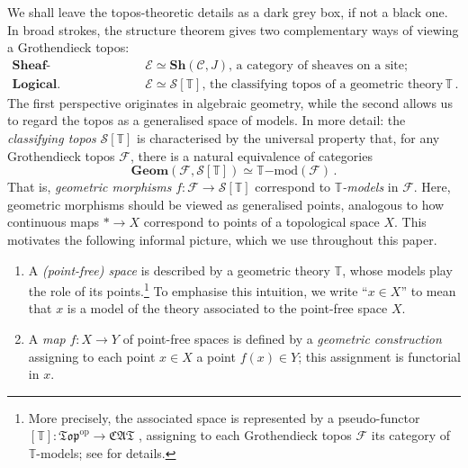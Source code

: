 \documentclass[a4paper, 11pt,reqno]{amsart}
\newcommand{\calF}{\mathcal{F}}
\newcommand{\calC}{\mathcal{C}}
\newcommand{\opp}{\mathrm{op}}    %
\newcommand{\baseS}{\mathcal{S}}
\newcommand{\thT}{\mathbb{T}}
\newcommand{\E}{\mathcal{E}}
\begin{document}
We shall leave the topos-theoretic details as a dark grey box, if not a black one. In broad strokes, the structure theorem gives two complementary ways of viewing a Grothendieck topos: 
\begin{align*}
 \textbf{Sheaf-theoretic.} &\qquad \E\simeq \textbf{Sh}(\calC,J),\,\text{a category of sheaves on a site;}\\
 \textbf{Logical.} &\qquad \E\simeq \baseS[\thT],\,\text{the classifying topos of a geometric theory}\,\thT\,.
\end{align*}
The first perspective originates in algebraic geometry, while the second allows us to regard the topos as a generalised space of models. In more detail: the {\em classifying topos} $\baseS[\thT]$ is characterised by the universal property that, for any Grothendieck topos $\calF$, there is a natural equivalence of categories 
$$\textbf{Geom}(\calF,\baseS[\thT])\simeq \thT\mathrm{-mod}(\calF)\,.$$
That is, {\em geometric morphisms} $f\colon \calF\to \baseS[\thT]$ correspond to {\em $\thT$-models} in $\calF$. Here, geometric morphisms should be viewed as generalised points, analogous to how continuous maps $\ast\to X$ correspond to points of a topological space $X$. This motivates the following informal picture, which we use throughout this paper.

\begin{definition}\label{def:ptFREEspace}\hfill
	\begin{enumerate}[label=(\roman*)]
		\item A \emph{(point-free) space} is described by a geometric theory $\thT$, whose models play the role of its points.\footnote{More precisely, the associated space is represented by a pseudo-functor $[\thT]\colon\mathfrak{Top}^{\opp}\to\mathfrak{CAT}$ , assigning to each Grothendieck topos $\calF$ its category of $\thT$-models; see \cite[Section B4.2]{Elephant} for details.}
		To emphasise this intuition, we write ``$x\in X$'' to mean that $x$ is a model of the theory associated to the point-free space $X$.
		
		\item 
		A {\em map} $f\colon X\rightarrow Y$ of point-free spaces is defined by a {\em geometric construction} assigning to each point $x\in X$ a point $f(x)\in Y$; this assignment is functorial in $x$.
	\end{enumerate}	 
\end{definition}
\end{document}
